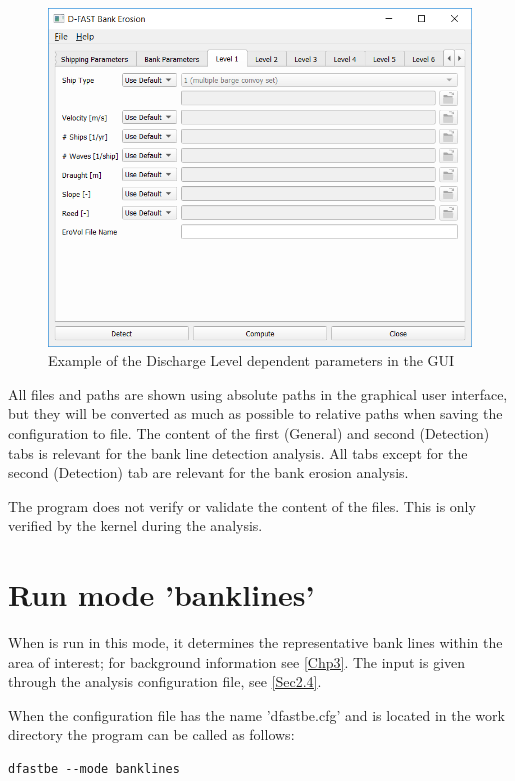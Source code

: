 \begin{figure}
\center
\includegraphics[width=\textwidth]{figures/gui6.png}
\caption{Example of the Discharge Level dependent parameters in the GUI}
\label{guiLevelX}
\end{figure}

All files and paths are shown using absolute paths in the graphical user interface, but they will be converted as much as possible to relative paths when saving the configuration to file.
The content of the first (General) and second (Detection) tabs is relevant for the bank line detection analysis.
All tabs except for the second (Detection) tab are relevant for the bank erosion analysis.

\Note The program does not verify or validate the content of the files.
This is only verified by the kernel during the analysis.

\section{Run mode 'banklines'} \label{Sec:rundetect}

When \dfastbe is run in this mode, it determines the representative bank lines within the area of interest; for background information see \autoref{Chp3}.
The input is given through the analysis configuration file, see \autoref{Sec2.4}.

When the configuration file has the name 'dfastbe.cfg' and is located in the work directory the program can be called as follows:

\begin{Verbatim}
dfastbe --mode banklines
\end{Verbatim}

